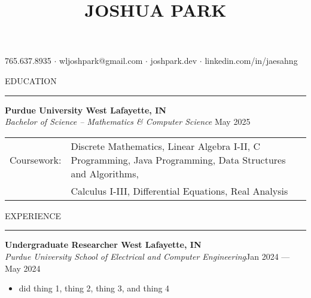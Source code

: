 \documentclass[letter,11pt]{article}
\begin{document}
\title{\Huge{JOSHUA PARK}}
\date{}
\maketitle
\vspace*{-6em}

\begin{center}\begin{small}
    765.637.8935 $\cdot$ wljoshpark@gmail.com $\cdot$ joshpark.dev $\cdot$ linkedin.com/in/jaesahng
\end{small}\end{center}

EDUCATION

\vspace*{-1.25em}
\rule{\textwidth}{1.2pt}
\textbf{Purdue University \hfill West Lafayette, IN}\\
\emph{Bachelor of Science -- Mathematics \& Computer Science} \hfill May 2025 \\
\begin{tabular}{@{}p{1.83cm}l}
    Coursework: & Discrete Mathematics, Linear Algebra I-II, C Programming, Java Programming, Data Structures and Algorithms,\\
    &Calculus I-III, Differential Equations, Real Analysis
\end{tabular}

EXPERIENCE

\vspace*{-1.25em}
\rule{\textwidth}{1.2pt}
\textbf{Undergraduate Researcher \hfill West Lafayette, IN}\\
\emph{Purdue University School of Electrical and Computer Engineering}\hfill Jan 2024 --- May 2024\\
\vspace*{-1.75em}
\begin{itemize}[label=-, leftmargin=*, labelwidth=1.5cm, align=left, noitemsep]
    \item did thing 1, thing 2, thing 3, and thing 4
\end{itemize}
\vspace*{-0.25em}
\end{document}
